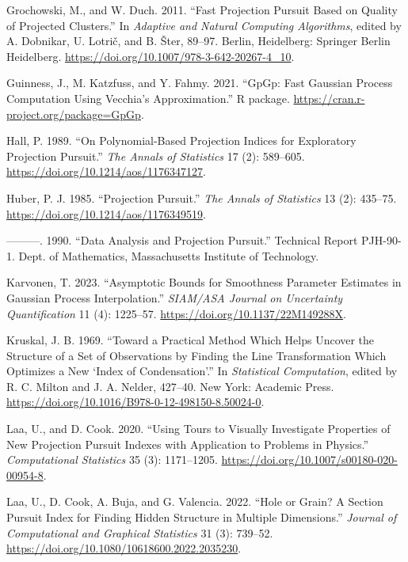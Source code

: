 \documentclass[
  12pt,
]{interact}
\newlength{\cslhangindent}
\newenvironment{CSLReferences}[2] %
 {\begin{list}{}{%
  \setlength{\itemindent}{0pt}
  \setlength{\leftmargin}{0pt}
  \setlength{\parsep}{0pt}
  \ifodd #1
   \setlength{\leftmargin}{\cslhangindent}
   \setlength{\itemindent}{-1\cslhangindent}
  \fi
  \setlength{\itemsep}{#2\baselineskip}}}
 {\end{list}}
\theoremstyle{plain}
\begin{document}
\begin{CSLReferences}{1}{0}
Grochowski, M., and W. Duch. 2011. {``Fast Projection Pursuit Based on
Quality of Projected Clusters.''} In \emph{Adaptive and Natural
Computing Algorithms}, edited by A. Dobnikar, U. Lotrič, and B. Šter,
89--97. Berlin, Heidelberg: Springer Berlin Heidelberg.
\url{https://doi.org/10.1007/978-3-642-20267-4_10}.

Guinness, J., M. Katzfuss, and Y. Fahmy. 2021. {``{GpGp}: Fast
{G}aussian Process Computation Using {V}ecchia's Approximation.''} R
package. \url{https://cran.r-project.org/package=GpGp}.

Hall, P. 1989. {``On Polynomial-Based Projection Indices for Exploratory
Projection Pursuit.''} \emph{The Annals of Statistics} 17 (2): 589--605.
\url{https://doi.org/10.1214/aos/1176347127}.

Huber, P. J. 1985. {``Projection Pursuit.''} \emph{The Annals of
Statistics} 13 (2): 435--75.
\url{https://doi.org/10.1214/aos/1176349519}.

---------. 1990. {``Data Analysis and Projection Pursuit.''} Technical
Report PJH-90-1. Dept. of Mathematics, Massachusetts Institute of
Technology.

Karvonen, T. 2023. {``Asymptotic Bounds for Smoothness Parameter
Estimates in {G}aussian Process Interpolation.''} \emph{SIAM/ASA Journal
on Uncertainty Quantification} 11 (4): 1225--57.
\url{https://doi.org/10.1137/22M149288X}.

Kruskal, J. B. 1969. {``Toward a Practical Method Which Helps Uncover
the Structure of a Set of Observations by Finding the Line
Transformation Which Optimizes a New {`Index of Condensation'}.''} In
\emph{Statistical Computation}, edited by R. C. Milton and J. A. Nelder,
427--40. New York: Academic Press.
\url{https://doi.org/10.1016/B978-0-12-498150-8.50024-0}.

Laa, U., and D. Cook. 2020. {``Using Tours to Visually Investigate
Properties of New Projection Pursuit Indexes with Application to
Problems in Physics.''} \emph{Computational Statistics} 35 (3):
1171--1205. \url{https://doi.org/10.1007/s00180-020-00954-8}.

Laa, U., D. Cook, A. Buja, and G. Valencia. 2022. {``Hole or Grain? A
Section Pursuit Index for Finding Hidden Structure in Multiple
Dimensions.''} \emph{Journal of Computational and Graphical Statistics}
31 (3): 739--52. \url{https://doi.org/10.1080/10618600.2022.2035230}.


\end{CSLReferences}
\end{document}
